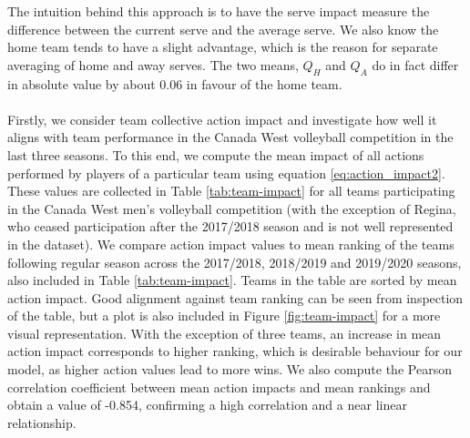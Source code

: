 \documentclass{sfuthesis}
\begin{document}
The intuition behind this approach is to have the serve impact measure the difference between the current serve and the average serve. We also know the home team tends to have a slight advantage, which is the reason for separate averaging of home and away serves. The two means, $Q_H$ and $Q_A$ do in fact differ in absolute value by about 0.06 in favour of the home team.\\\\
Firstly, we consider team collective action impact and investigate how well it aligns with team performance in the Canada West volleyball competition in the last three seasons. To this end, we compute the mean impact of all actions performed by players of a particular team using equation \eqref{eq:action_impact2}. These values are collected in Table \ref{tab:team-impact} for all teams participating in the Canada West men's volleyball competition (with the exception of Regina, who ceased participation after the 2017/2018 season and is not well represented in the dataset). We compare action impact values to mean ranking of the teams following regular season across the 2017/2018, 2018/2019 and 2019/2020 seasons, also included in Table \ref{tab:team-impact}. Teams in the table are sorted by mean action impact. Good alignment against team ranking can be seen from inspection of the table, but a plot is also included in Figure \ref{fig:team-impact} for a more visual representation. With the exception of three teams, an increase in mean action impact corresponds to higher ranking, which is desirable behaviour for our model, as higher action values lead to more wins. We also compute the Pearson correlation coefficient between mean action impacts and mean rankings and obtain a value of -0.854, confirming a high correlation and a near linear relationship.\\
\end{document}
